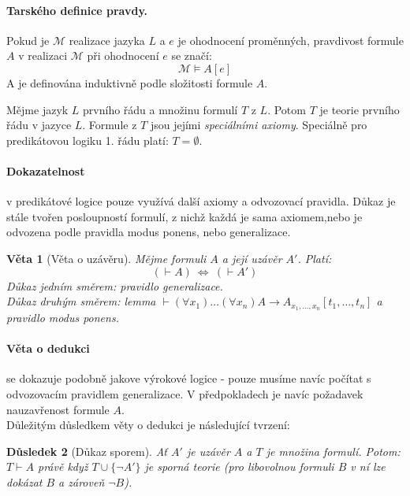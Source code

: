 \documentclass[a4paper]{article}      %
\newtheorem{theorem}{Věta}[section]
\newtheorem{corollary}[theorem]{Důsledek}
\newenvironment{definition}[1][Definice]{\begin{trivlist}
\item[\hskip \labelsep {\bfseries #1}]}{\end{trivlist}}
\begin{document}
\paragraph{Tarského definice pravdy.} Pokud je $\mathcal{M}$ realizace jazyka $L$ a $e$ je ohodnocení proměnných, pravdivost formule
$A$ v realizaci $\mathcal{M}$ při ohodnocení $e$ se značí:
\[
\mathcal{M} \models A[e]
\]
A je definována induktivně podle složitosti formule $A$.

\begin{definition}[Teorie prvního řádu]
Mějme jazyk $L$ prvního řádu a množinu formulí $T$ z $L$. Potom $T$ je teorie prvního řádu v jazyce $L$.
Formule z $T$ jsou jejími \emph{speciálními axiomy}. Speciálně pro predikátovou logiku 1. řádu platí: $T = \emptyset$.
\end{definition}

\paragraph{Dokazatelnost} v predikátové logice pouze využívá další axiomy a odvozovací pravidla.
Důkaz je stále tvořen posloupností formulí, z nichž každá je sama axiomem,nebo je odvozena podle pravidla modus ponens, nebo generalizace.

\begin{theorem}[Věta o uzávěru]
Mějme formuli $A$ a její uzávěr $A'$. Platí:
\[
(\vdash A)\ \Leftrightarrow\ (\vdash A')  
\]
Důkaz jedním směrem: pravidlo generalizace.\\
Důkaz druhým směrem: lemma $\vdash (\forall x_1)\ldots(\forall x_n)A \rightarrow A_{x_1,\ldots,x_{n}}[t_1,\ldots,t_{n}]$ a pravidlo modus ponens.
\end{theorem}

\paragraph{Věta o dedukci} se dokazuje podobně jakove výrokové logice - pouze musíme navíc počítat s odvozovacím pravidlem generalizace.
V předpokladech je navíc požadavek nauzavřenost formule $A$.\\
Důležitým důsledkem věty o dedukci je následující tvrzení:

\begin{corollary}[Důkaz sporem]
Ať $A'$ je uzávěr $A$ a $T$ je množina formulí. Potom:
$T \vdash A$ právě když $T \cup \lbrace \neg A'\rbrace$ je sporná teorie (pro libovolnou formuli $B$ v ní lze dokázat $B$ a zároveň $\neg B$).
\end{corollary}
\end{document}
